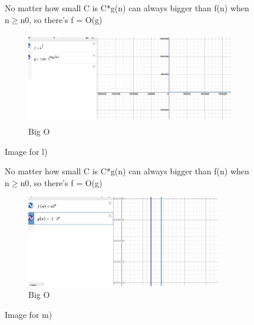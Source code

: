 \documentclass{article}
\begin{document}
\begin{enumerate}[label=(\alph*)]
\begin{figure}[h]    
\item %
No matter how small C is C*g(n) can always bigger than f(n) when n$\ge$n0, so there's f = O(g)\\
    \begin{subfigure}{0.5\textwidth}
    \includegraphics[width=0.9\linewidth, height=4cm]{l) big O.png}
    \caption{Big O}
    \label{fig:subim1}
    \end{subfigure}
    \caption{Image for l)}
    \label{fig:image2}
    \end{figure}

\begin{figure}[h]
\item %
No matter how small C is C*g(n) can always bigger than f(n) when n$\ge$n0, so there's f = O(g)\\
    \begin{subfigure}{0.5\textwidth}
    \includegraphics[width=0.9\linewidth, height=4cm]{m big O.png}
    \caption{Big O}
    \label{fig:subim1}
    \end{subfigure}
    \caption{Image for m)}
    \label{fig:image2}
    \end{figure}
 

\end{enumerate}
\end{document}
